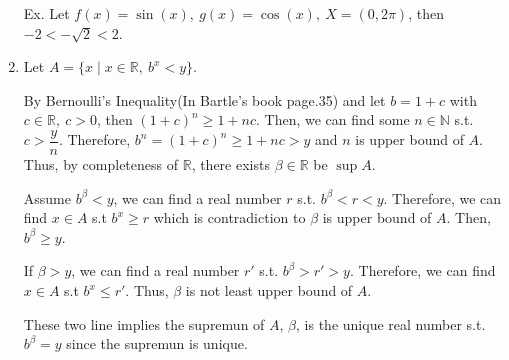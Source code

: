 \documentclass[12pt]{article}
\begin{document}
\begin{enumerate}
    Ex. Let $f(x) = \sin(x),\ g(x) = \cos(x),\ X = (0, 2\pi)$, then $-2 < -\sqrt{2} < 2$.

    \item Let $A = \lbrace x \mid x \in \mathbb{R},\ b^x < y\rbrace$.
    
    By Bernoulli's Inequality(In Bartle's book page.35) and let $b = 1+c$ with $c \in \mathbb{R},\ c > 0$, then $(1+c)^n \geq 1 + nc$.
    Then, we can find some $n \in \mathbb{N}$ s.t. $c > \dfrac{y}{n}$. Therefore, $b^n = (1+c)^n \geq 1+nc > y$ and $n$ is upper bound of $A$. Thus, by completeness of $\mathbb{R}$, there exists $\beta \in \mathbb{R}$ be $\sup A$. 
    
    Assume $b^\beta < y$, we can find a real number $r$ s.t. $b^\beta < r < y$. Therefore, we can find $x \in A$ s.t $b^x \geq r$ which is contradiction to $\beta$ is upper bound of $A$.
    Then, $b^\beta \geq y$. 

    If $\beta > y$, we can find a real number $r'$ s.t. $b^\beta > r' > y$. Therefore, we can find $x \in A$ s.t $b^x \leq r'$. 
    Thus, $\beta$ is not least upper bound of $A$.

    These two line implies the supremun of $A$, $\beta$, is the unique real number s.t. $b^\beta = y$ since the supremun is unique.
\end{enumerate}
\end{document}
